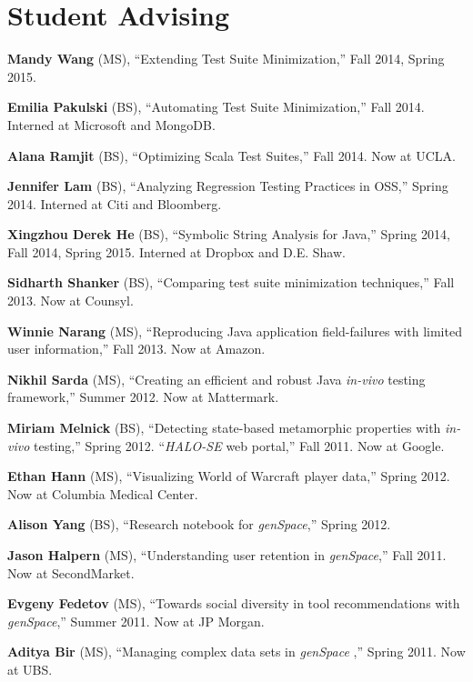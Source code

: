 \documentclass[10pt]{article}
\begin{document}
\section{Student Advising}
\begin{bibsection}
\setlength\itemsep{2pt}
\item \textbf{Mandy Wang} (MS), ``Extending Test Suite Minimization,'' Fall 2014, Spring 2015.


\item \textbf{Emilia Pakulski} (BS), ``Automating Test Suite Minimization,'' Fall 2014. Interned at Microsoft and MongoDB.


\item \textbf{Alana Ramjit} (BS), ``Optimizing Scala Test Suites,'' Fall 2014. Now at UCLA.


\item \textbf{Jennifer Lam} (BS), ``Analyzing Regression Testing Practices in OSS,'' Spring 2014. Interned at Citi and Bloomberg.

\item \textbf{Xingzhou Derek He} (BS), ``Symbolic String Analysis for Java,'' Spring 2014, Fall 2014, Spring 2015. Interned at Dropbox and D.E. Shaw.

\item \textbf{Sidharth Shanker} (BS), ``Comparing test suite minimization techniques,'' Fall 2013. Now at Counsyl.

\item \textbf{Winnie Narang} (MS), ``Reproducing Java application field-failures with limited user information,''  Fall 2013. Now at Amazon.

\item \textbf{Nikhil Sarda} (MS), ``Creating an efficient and robust Java \emph{in-vivo} testing framework,'' Summer 2012. Now at Mattermark.

\item \textbf{Miriam Melnick} (BS), ``Detecting state-based metamorphic properties with \emph{in-vivo} testing,'' Spring 2012. ``\emph{HALO-SE} web portal,'' Fall 2011.  Now at Google.

\item \textbf{Ethan Hann} (MS), ``Visualizing World of Warcraft player data,'' Spring 2012. Now at Columbia Medical Center.

\item \textbf{Alison Yang} (BS), ``Research notebook for \emph{genSpace},'' Spring 2012.

\item \textbf{Jason Halpern} (MS), ``Understanding user retention in \emph{genSpace},'' Fall 2011. Now at SecondMarket.


\item \textbf{Evgeny Fedetov} (MS), ``Towards social diversity in tool recommendations with \emph{genSpace},'' Summer 2011. Now at JP Morgan.
 
\item \textbf{Aditya Bir} (MS), ``Managing complex data sets in \emph{genSpace} ,'' Spring 2011. Now at UBS.
 \end{bibsection}
\end{document}
